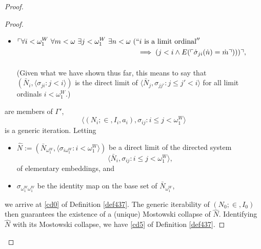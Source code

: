 \documentclass[12pt, twoside]{memoir}
\numberwithin{equation}{section}
\theoremstyle{definition}
\theoremstyle{remark}
\theoremstyle{definition}
\theoremstyle{definition}
\theoremstyle{definition}
\theoremstyle{remark}
\begin{document}
\begin{proof}
\begin{proof}
\begin{itemize}
    \item 
    \!
    $\begin{aligned}[t]
        \ulcorner \forall i < \omega_1^W \ \forall m < \omega \ \exists j < \omega_1^W \ \exists n < \omega \ ( & ``i \text{ is a limit ordinal}'' \\ 
        & \implies  (j < i \wedge E(\ulcorner \dot{\sigma}_{ji}(\dot{n}) = \dot{m} \urcorner))) \urcorner,
    \end{aligned}$
    \\
    \\
    (Given what we have shown thus far, this means to say that $(\bar{N}_i, \langle \sigma_{ji} : j < i \rangle)$ is the direct limit of $\langle \bar{N}_j, \sigma_{jj'} : j \leq j' < i \rangle$ for all limit ordinals $i < \omega_1^W$.)
\end{itemize}
are members of $\Gamma'$, 
\begin{equation*}
    \langle (N_i; \in, I_i, a_i), \sigma_{ij} : i \leq j < \omega_1^W \rangle
\end{equation*} 
is a generic iteration. Letting 
\begin{itemize}
    \item $\hat{N} := (\bar{N}_{\omega_1^W}, \langle \sigma_{i\omega_1^W} : i < \omega_1^W \rangle)$ be a direct limit of the directed system
    \begin{equation*}
        \langle \bar{N}_i, \sigma_{ij} : i \leq j < \omega_1^W \rangle \text{,}
    \end{equation*}
    of elementary embeddings, and
    \item $\sigma_{\omega_1^W\omega_1^W}$ be the identity map on the base set of $\bar{N}_{\omega_1^W}$,
\end{itemize}
we arrive at \ref{cd0} of Definition \ref{def437}. The generic iterability of $(N_0; \in, I_0)$ then guarantees the existence of a (unique) Mostowski collapse of $\hat{N}$. Identifying $\hat{N}$ with its Mostowski collapse, we have \ref{cd5} of Definition \ref{def437}.


\end{proof}
\end{proof}
\end{document}
